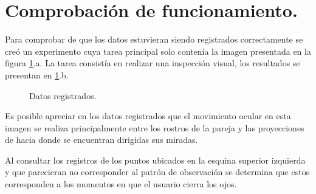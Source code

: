 \documentclass[\main/main.tex]{subfiles}
\begin{document}
    \section{Comprobación de funcionamiento.}
    \label{sec:04_resultados}
        Para comprobar de que los datos estuvieran siendo registrados correctamente se creó un experimento cuya tarea principal solo contenía la imagen presentada en la figura \ref{fig:04_frame_result}.a. La tarea consistía en realizar una inspección visual, los resultados se presentan en \ref{fig:04_frame_result}.b.

        \begin{figure}[H]
            \centering
            \hspace{5mm}
            \caption{Datos registrados.}
            \label{fig:04_frame_result}
        \end{figure}

        Es posible apreciar en los datos registrados que el movimiento ocular en esta imagen se realiza principalmente entre los rostros de la pareja y las proyecciones de hacia donde se encuentran dirigidas sus miradas.

        Al consultar los registros de los puntos ubicados en la esquina superior izquierda y que parecieran no corresponder al patrón de observación se determina que estos corresponden a los momentos en que el usuario cierra los ojos.    
        


\end{document}
